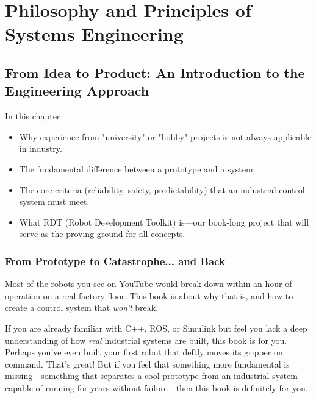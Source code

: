 \part{Philosophy and Principles of Systems Engineering}
\pagestyle{github}

\chapter{From Idea to Product: An Introduction to the Engineering Approach}

\begin{navigationbox}{In this chapter}
    \begin{itemize}
        \item Why experience from "university" or "hobby" projects is not always applicable in industry.
        \item The fundamental difference between a prototype and a  system.
        \item The core criteria (reliability, safety, predictability) that an industrial control system must meet.
        \item What RDT (Robot Development Toolkit) is—our book-long project that will serve as the proving ground for all concepts.
    \end{itemize}
\end{navigationbox}

\section{From Prototype to Catastrophe... and Back}

Most of the robots you see on YouTube would break down within an hour of operation on a real factory floor. This book is about why that is, and how to create a control system that \textit{won't} break.

If you are already familiar with C++, ROS, or Simulink but feel you lack a deep understanding of how \textit{real} industrial systems are built, this book is for you. Perhaps you've even built your first robot that deftly moves its gripper on command. That's great! But if you feel that something more fundamental is missing—something that separates a cool prototype from an industrial system capable of running for years without failure—then this book is definitely for you.

